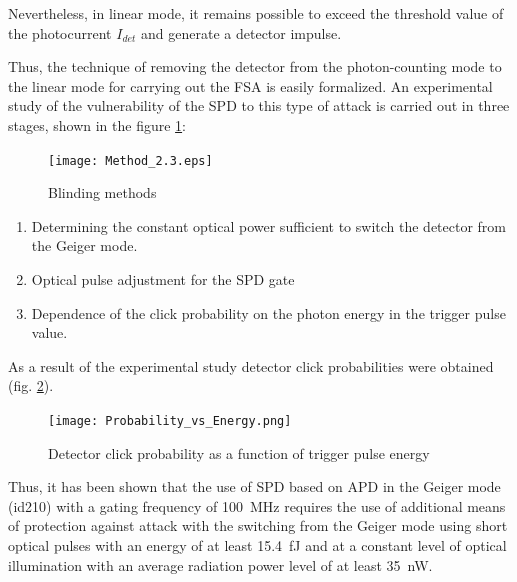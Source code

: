 Nevertheless, in linear mode, it remains possible to exceed the threshold value of the photocurrent $I_{det}$ and generate a detector impulse.

Thus, the technique of removing the detector from the photon-counting mode to the linear mode for carrying out the FSA is easily formalized. An experimental study of the vulnerability of the SPD to this type of attack is carried out in three stages, shown in the figure \ref{fig:Method_2.3}:
%
 \begin{figure}[ht] 
  \centering
  \texttt{[image: Method\_2.3.eps]}
  \caption{Blinding methods}
  \label{fig:Method_2.3}
\end{figure}
%
 \begin{enumerate}
	\item Determining the constant optical power sufficient to switch the detector from the Geiger mode.
	\item Optical pulse adjustment for the SPD gate
	\item Dependence of the click probability on the photon energy in the trigger pulse value.
\end{enumerate}
%
As a result of the experimental study detector click probabilities were obtained (fig. \ref{fig:Probability_vs_Energy}). 

\begin{figure}[ht]
  \centering
  \texttt{[image: Probability\_vs\_Energy.png]}
  \caption{Detector click probability as a function of trigger pulse energy}
  \label{fig:Probability_vs_Energy}
\end{figure}


Thus, it has been shown that the use of SPD based on APD in the Geiger mode (id210) with a gating frequency of 100~MHz requires the use of additional means of protection against attack with the switching from the Geiger mode using short optical pulses with an energy of at least 15.4~fJ and at a constant level of optical illumination with an average radiation power level of at least 35~nW. 

